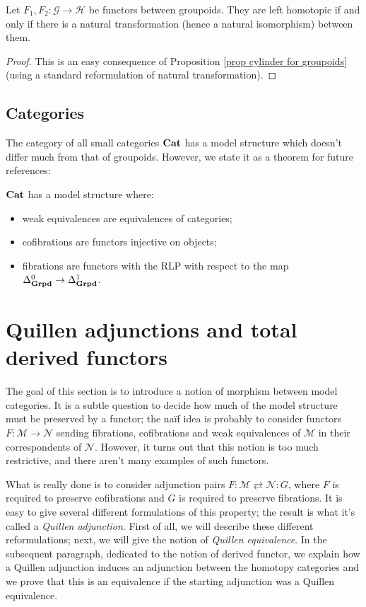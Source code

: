 \begin{refsection}
\begin{cor}
Let $F_1,F_2 \colon \mathcal G \to \mathcal H$ be functors between groupoids. They are left homotopic if and only if there is a natural transformation (hence a natural isomorphism) between them.
\end{cor}

\begin{proof}
This is an easy consequence of Proposition \ref{prop cylinder for groupoids} (using a standard reformulation of natural transformation).
\end{proof}

\subsection{Categories} \label{model structure on cat}

The category of all small categories $\mathbf{Cat}$ has a model structure which doesn't differ much from that of groupoids. However, we state it as a theorem for future references:

\begin{thm} \label{thm model structure on cat}
$\mathbf{Cat}$ has a model structure where:
\begin{itemize}
\item weak equivalences are equivalences of categories;
\item cofibrations are functors injective on objects;
\item fibrations are functors with the RLP with respect to the map $\Delta^0_{\mathbf{Grpd}} \to \Delta^1_{\mathbf{Grpd}}$.
\end{itemize}
\end{thm}


\section{Quillen adjunctions and total derived functors}

The goal of this section is to introduce a notion of morphism between model categories. It is a subtle question to decide how much of the model structure must be preserved by a functor; the na\"if idea is probably to consider functors $F \colon \mathcal M \to \mathcal N$ sending fibrations, cofibrations and weak equivalences of $\mathcal M$ in their correspondents of $\mathcal N$. However, it turns out that this notion is too much restrictive, and there aren't many examples of such functors.

What is really done is to consider adjunction pairs $F \colon \mathcal M \rightleftarrows \mathcal N \colon G$, where $F$ is required to preserve cofibrations and $G$ is required to preserve fibrations. It is easy to give several different formulations of this property; the result is what it's called a \emph{Quillen adjunction}. First of all, we will describe these different reformulations; next, we will give the notion of \emph{Quillen equivalence}. In the subsequent paragraph, dedicated to the notion of derived functor, we explain how a Quillen adjunction induces an adjunction between the homotopy categories and we prove that this is an equivalence if the starting adjunction was a Quillen equivalence.


\end{refsection}
